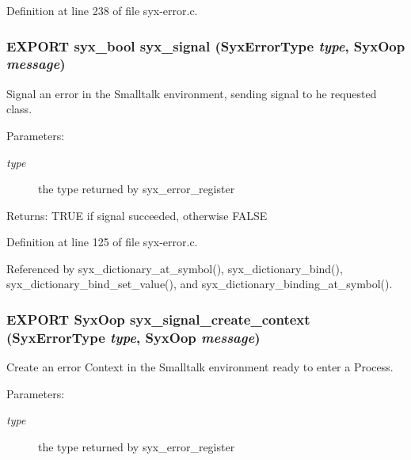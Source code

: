 Definition at line 238 of file syx-error.c.\hypertarget{syx-error_8h_9e42294f55fa2b19c5bd23202111d7e2}{
\subsubsection{\setlength{\rightskip}{0pt plus 5cm}EXPORT {\bf syx\_\-bool} syx\_\-signal ({\bf SyxErrorType} {\em type}, \/  {\bf SyxOop} {\em message})}}
\label{syx-error_8h_9e42294f55fa2b19c5bd23202111d7e2}


Signal an error in the Smalltalk environment, sending signal to he requested class.

\begin{Desc}
\item[Parameters:]
\begin{description}
\item[{\em type}]the type returned by syx\_\-error\_\-register \end{description}
\end{Desc}
\begin{Desc}
\item[Returns:]TRUE if signal succeeded, otherwise FALSE \end{Desc}


Definition at line 125 of file syx-error.c.

Referenced by syx\_\-dictionary\_\-at\_\-symbol(), syx\_\-dictionary\_\-bind(), syx\_\-dictionary\_\-bind\_\-set\_\-value(), and syx\_\-dictionary\_\-binding\_\-at\_\-symbol().\hypertarget{syx-error_8h_6069be5517f12619d0ffa9d6e3f8345d}{
\subsubsection{\setlength{\rightskip}{0pt plus 5cm}EXPORT {\bf SyxOop} syx\_\-signal\_\-create\_\-context ({\bf SyxErrorType} {\em type}, \/  {\bf SyxOop} {\em message})}}
\label{syx-error_8h_6069be5517f12619d0ffa9d6e3f8345d}


Create an error Context in the Smalltalk environment ready to enter a Process.

\begin{Desc}
\item[Parameters:]
\begin{description}
\item[{\em type}]the type returned by syx\_\-error\_\-register \end{description}
\end{Desc}


